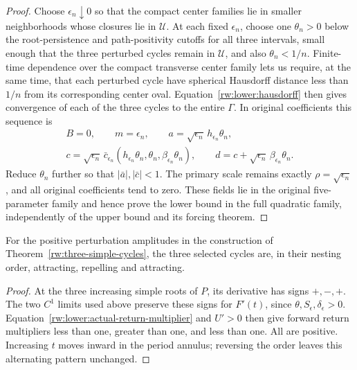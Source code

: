 \begin{proof}
Choose $\epsilon_n\downarrow0$ so that the compact center families
lie in smaller neighborhoods whose closures lie in $\mathscr U$.
At each fixed $\epsilon_n$, choose one $\theta_n>0$ below the
root-persistence and path-positivity cutoffs for all three intervals,
small enough that the three perturbed cycles remain in $\mathscr U$,
and also $\theta_n<1/n$. Finite-time dependence over the compact
transverse center family lets us require, at the same time, that each
perturbed cycle have spherical Hausdorff distance less than $1/n$
from its corresponding center oval. Equation~\eqref{rw:lower:hausdorff}
then gives convergence of each of the three cycles to the entire
$\Gamma$.
In original coefficients this sequence is
\[
 \begin{gathered}
 B=0,\qquad m=\epsilon_n,\qquad
 a=\sqrt{\epsilon_n}\,h_{\epsilon_n}\theta_n,\\
 c=\sqrt{\epsilon_n}\,
   \bar c_{\epsilon_n}(h_{\epsilon_n}\theta_n,\theta_n,
                              \beta_{\epsilon_n}\theta_n),\qquad
 d=c+\sqrt{\epsilon_n}\,\beta_{\epsilon_n}\theta_n .
 \end{gathered}
\]
Reduce $\theta_n$ further so that $|\bar a|,|\bar c|<1$.
The primary scale remains exactly $\rho=\sqrt{\epsilon_n}$,
and all original coefficients tend to zero.
These fields lie in the original five-parameter family and hence
prove the lower bound in the full quadratic family, independently
of the upper bound and its forcing theorem.
\end{proof}

\begin{corollary}\label{rw:lower:stability}
For the positive perturbation amplitudes in the construction of
Theorem~\ref{rw:three-simple-cycles}, the three selected cycles are,
in their nesting order, attracting, repelling and attracting.
\end{corollary}
\begin{proof}
At the three increasing simple roots of $P$, its derivative has
signs $+,-,+$. The two $C^1$ limits used above preserve these signs
for $F'(t)$, since $\theta,S_\epsilon,\delta_\epsilon>0$.
Equation~\eqref{rw:lower:actual-return-multiplier} and $U'>0$ then
give forward return multipliers less than one, greater than one,
and less than one. All are positive. Increasing $t$ moves inward
in the period annulus; reversing the order leaves this alternating
pattern unchanged.
\end{proof}
